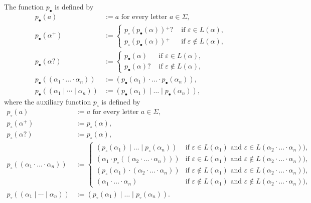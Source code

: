 \documentclass[a4paper,11pt, svgnames,titlepage]{article}
\newcommand{\rxp}{{^\mathtt{+}}}
\newcommand{\rxo}{\mathtt{?}}
\newcommand{\rxc}{\cdot}
\DeclareMathOperator{\ror}{\mathtt{|}}
\newcommand{\emptyword}{\varepsilon}
\newcommand{\df}{:=}
\newcommand{\wpnffun}{p_{\bullet}}
\newcommand{\wpnfhfun}{p_{\circ}}
\newcommand{\wpnf}[1]{\wpnffun{\left(#1\right)}}
\newcommand{\wpnfh}[1]{\wpnfhfun{\left(#1\right)}}
\begin{document}
The function $\wpnffun$ is defined by
\begin{align*}
	\wpnf{a}&\df a \text{ for every letter $a\in \Sigma$,}\\
	\wpnf{\alpha\rxp}
		&\df \begin{cases}
			\wpnfh{\wpnf{\alpha}}\rxp\rxo & \text{ if $\emptyword\in L(\alpha)$,}\\
			\wpnfh{\wpnf{\alpha}}\rxp & \text{ if $\emptyword\notin L(\alpha)$,}
		\end{cases}\\
	\wpnf{\alpha\rxo}
		&\df \begin{cases}
			\wpnf{\alpha} & \text{ if $\emptyword\in L(\alpha)$,}\\
			\wpnf{\alpha}\rxo & \text{ if $\emptyword\notin L(\alpha)$,}
		\end{cases}\\
	\wpnf{(\alpha_1\rxc \ldots \rxc \alpha_n)}
		&\df (\wpnf{\alpha_1}\rxc \ldots \rxc \wpnf{\alpha_n}),\\
	\wpnf{(\alpha_1\ror \cdots \ror \alpha_n)}
		&\df (\wpnf{\alpha_1} \ror \ldots \ror \wpnf{\alpha_n}),
\end{align*}
where the auxiliary function $\wpnfhfun$ is defined by 
\begin{align*}
	\wpnfh{a}&\df a\text{ for every letter $a\in \Sigma$,}\\
	\wpnfh{\alpha\rxp}
		&\df \wpnfh{\alpha},\\
	\wpnfh{\alpha\rxo}
		&\df \wpnfh{\alpha},\\
	\wpnfh{(\alpha_1\rxc \ldots \rxc \alpha_n)}
		&\df \begin{cases}
			(\wpnfh{\alpha_1}\ror \ldots \ror \wpnfh{\alpha_n}) & \text{if $\emptyword\in L(\alpha_1)$ and $\emptyword\in L(\alpha_2\rxc \ldots \rxc \alpha_n))$},\\
			(\alpha_1\rxc \wpnfh{(\alpha_2\rxc \ldots \rxc \alpha_n)}) & \text{if $\emptyword\in L(\alpha_1)$ and $\emptyword\notin L(\alpha_2\rxc \ldots \rxc \alpha_n))$},\\
			(\wpnfh{\alpha_1}\rxc (\alpha_2\rxc \ldots \rxc \alpha_n)) & \text{if $\emptyword\notin L(\alpha_1)$ and $\emptyword\in L(\alpha_2\rxc \ldots \rxc \alpha_n))$},\\
			(\alpha_1\rxc \ldots \rxc \alpha_n) & \text{if $\emptyword\notin L(\alpha_1)$ and $\emptyword\notin L(\alpha_2\rxc \ldots \rxc \alpha_n))$},
		\end{cases}\\
	\wpnfh{(\alpha_1\ror \cdots \ror \alpha_n)}
		&\df (\wpnfh{\alpha_1}\ror \ldots \ror \wpnfh{\alpha_n}).
\end{align*}
\end{document}
